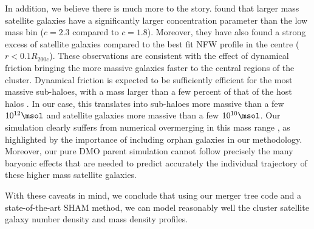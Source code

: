 In   addition,    we   believe   there    is   much   more    to   the
story. \citet{vanderburgEvidenceInsideoutGrowth2015} found that larger
mass  satellite galaxies  have  a  significantly larger  concentration
parameter   than    the   low   mass   bin    ($c=2.3$   compared   to
$c=1.8$). Moreover, they have also  found a strong excess of satellite
galaxies compared to the best fit NFW  profile in the centre ($r < 0.1
R_{200c}$).   These observations  are  consistent with  the effect  of
dynamical friction  bringing the more  massive galaxies faster  to the
central regions of  the cluster. Dynamical friction is  expected to be
sufficiently efficient  for the  most massive  sub-haloes, with  a mass
larger than a few  percent of that of the host  halos
\citep[e.g.][]{binneyGalacticDynamicsSecond2008a,moGalaxyFormationEvolution2010}.
In our case, this  translates into
sub-haloes  more  massive  than  a  few  $10^{12}\msol$  and  satellite
galaxies  more  massive than  a  few  $10^{10}\msol$.  Our  simulation
clearly suffers from  numerical overmerging in this  mass range
\citep{vandenboschDisruptionDarkMatter2018}, as highlighted  by the
importance of including  orphan galaxies in
our  methodology.  Moreover,  our  pure DMO  parent simulation  cannot
follow precisely the many baryonic  effects that are needed to predict
accurately the  individual trajectory  of these higher  mass satellite
galaxies.

With these  caveats in mind,  we conclude  that using our  merger tree
code and a  state-of-the-art SHAM method, we can  model reasonably well
the cluster satellite galaxy number density and mass density profiles.
